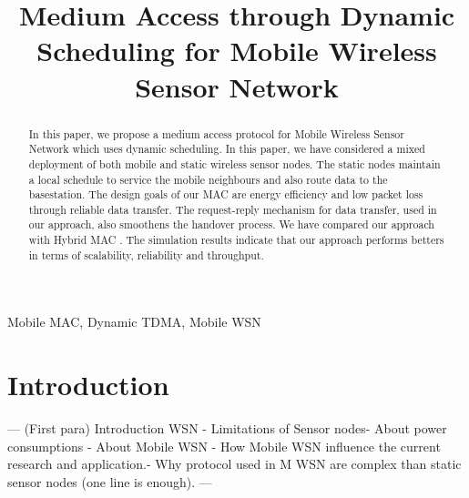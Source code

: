 \documentclass[a4paper, conference, 10pt]{IEEEtran}
\begin{document}
%
\title{Medium Access through Dynamic Scheduling for Mobile Wireless Sensor Network}



\author{
}

\maketitle

\begin{abstract}
	In this paper, we propose a medium access protocol for Mobile Wireless Sensor Network which uses dynamic scheduling. In this paper, we have considered a mixed deployment of both mobile and static wireless sensor nodes. The static nodes maintain a local schedule to service the mobile neighbours and also route data to the basestation. The design goals of our MAC are energy efficiency and low packet loss through reliable data transfer. The request-reply mechanism for data transfer, used in our approach, also smoothens the handover process. We have compared our approach with Hybrid MAC \cite{hmac}. The simulation results indicate that our approach performs betters in terms of scalability, reliability and throughput.%

\end{abstract}

\begin{keywords}
Mobile MAC, Dynamic TDMA, Mobile WSN
\end{keywords}

\IEEEpeerreviewmaketitle

\section{Introduction}
--- (First para) Introduction  WSN - Limitations of Sensor nodes- About power consumptions - About Mobile WSN - How Mobile WSN influence the current research and application.- Why protocol used in M WSN are complex than static sensor nodes (one line is enough). ---\\ \\
\end{document}
